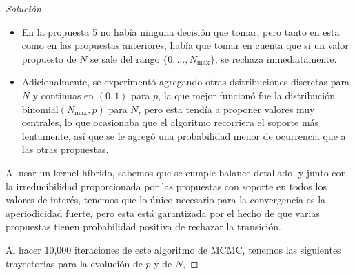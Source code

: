 \documentclass{article}
\begin{document}
\begin{enumerate}
\begin{proof}[Solución]
\begin{itemize}
            \item En la propuesta 5 no había ninguna decisión que tomar, pero tanto en esta 
            como en las propuestas anteriores, había que tomar en cuenta que si un valor 
            propuesto de $N$ se sale del rango $\{0,\dots,N_{\max}\}$, se rechaza 
            inmediatamente.

            \item Adicionalmente, se experimentó agregando otras dsitribuciones discretas 
            para $N$ y continuas en $(0,1)$ para $p$, la que mejor funcionó fue la distribución
            binomial$(N_{\max},p)$ para $N$, pero esta tendía a proponer valores muy centrales,
            lo que ocasionaba que el algoritmo recorriera el soporte más lentamente, así que se
            le agregó una probabilidad menor de ocurrencia que a las otras propuestas.
        \end{itemize}

        Al usar un kernel híbrido, sabemos que se cumple balance detallado, y junto con la 
        irreducibilidad proporcionada por las propuestas con soporte en todos los valores
        de interés, tenemos que lo único necesario para la convergencia es la aperiodicidad
        fuerte, pero esta está garantizada por el hecho de que varias propuestas tienen 
        probabilidad positiva de rechazar la transición.

        Al hacer 10,000 iteraciones de este algoritmo de MCMC, tenemos las siguientes
        trayectorias para la evolución de $p$ y de $N$,


\end{proof}
\end{enumerate}
\end{document}

